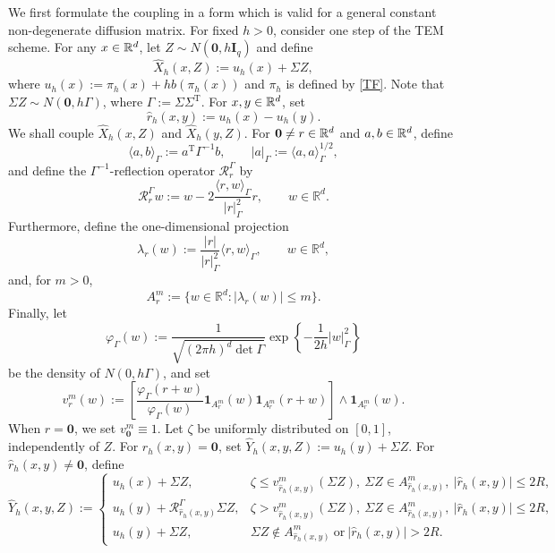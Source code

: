 \documentclass[aap]{imsart}
\theoremstyle{plain}
\theoremstyle{definition}
\begin{document}
We first formulate the coupling in a form which is valid for a general
constant non-degenerate diffusion matrix. For fixed \(h>0\), consider one step of the TEM scheme. For any \(x\in\mathbb{R}^d\),
let \(Z\sim N(\mathbf{0},h\mathbf{I}_q)\) and define
\[
\hat X_h(x,Z):=u_h(x)+\Sigma Z,
\]
where \(u_h(x):=\pi_h(x)+h b(\pi_h(x))\) and \(\pi_h\) is defined by \eqref{TF}. Note that \(\Sigma Z\sim N(\mathbf{0},h\Gamma)\), where \(\Gamma:=\Sigma\Sigma^{\mathrm T}\). For \(x,y\in\mathbb{R}^d\), set
\[
\hat r_h(x,y):=u_h(x)-u_h(y).
\]
We shall couple \(\hat X_h(x, Z)\) and \(\hat X_h(y, Z)\).
For \(\mathbf{0}\neq r\in \mathbb{R}^d\) and \(a, b\in \mathbb{R}^d\), define
\[
\langle a,b\rangle_\Gamma:=a^{\mathrm T}\Gamma^{-1}b,
\qquad
|a|_\Gamma:=\langle a,a\rangle_\Gamma^{1/2},
\]
and define the \(\Gamma^{-1}\)-reflection operator \(\mathcal R_r^\Gamma\) by
\[
\mathcal R_r^\Gamma w
:=
w-2\frac{\langle r,w\rangle_\Gamma}{|r|_\Gamma^2}r,
\qquad w\in\mathbb R^d.
\]
Furthermore, define the one-dimensional projection
\[
\lambda_r(w)
:=
\frac{|r|}{|r|_\Gamma^2}\langle r,w\rangle_\Gamma,
\qquad w\in\mathbb R^d,
\]
and, for \(m>0\),
\[
A_r^m
:=
\{w\in\mathbb R^d:|\lambda_r(w)|\leqslant m\}.
\]
Finally, let
\[
\varphi_\Gamma(w)
:=
\frac{1}{\sqrt{(2\pi h)^d\det\Gamma}}
\exp\left\{-\frac{1}{2h}|w|_\Gamma^2\right\}
\]
be the density of \(N(0,h\Gamma)\), and set
\[
v_r^m(w)
:=
\left[
\frac{\varphi_\Gamma(r+w)}{\varphi_\Gamma(w)}
\mathbf 1_{A_r^m}(w)\mathbf 1_{A_r^m}(r+w)
\right]
\wedge
\mathbf 1_{A_r^m}(w).
\]
When \(r=\mathbf{0}\), we set \(v_{\mathbf{0}}^m\equiv1\).
Let \(\zeta\) be uniformly distributed on \([0,1]\), independently of \(Z\).
For \(\hat r_h(x,y)=\mathbf{0}\), set \(\hat Y_h(x,y, Z):=u_h(y)+\Sigma Z\).
For \(\hat r_h(x,y)\neq\mathbf{0}\), define
\begin{equation}\label{hY}
\hat Y_h(x,y, Z)
:=
\begin{cases}
	u_h(x)+\Sigma Z,
	& \zeta\leqslant v_{\hat r_h(x,y)}^m(\Sigma Z),\ \Sigma Z\in A_{\hat r_h(x,y)}^m,\ |\hat r_h(x,y)|\leqslant 2R,\\[1mm]
	u_h(y)+\mathcal R_{\hat r_h(x,y)}^\Gamma\Sigma Z,
	& \zeta> v_{\hat r_h(x,y)}^m(\Sigma Z),\ \Sigma Z\in A_{\hat r_h(x,y)}^m,\ |\hat r_h(x,y)|\leqslant 2R,\\[1mm]
	u_h(y)+\Sigma Z,
	& \Sigma Z\notin A_{\hat r_h(x,y)}^m\ \text{or}\ |\hat r_h(x,y)|>2R .
\end{cases}
\end{equation}
\end{document}
